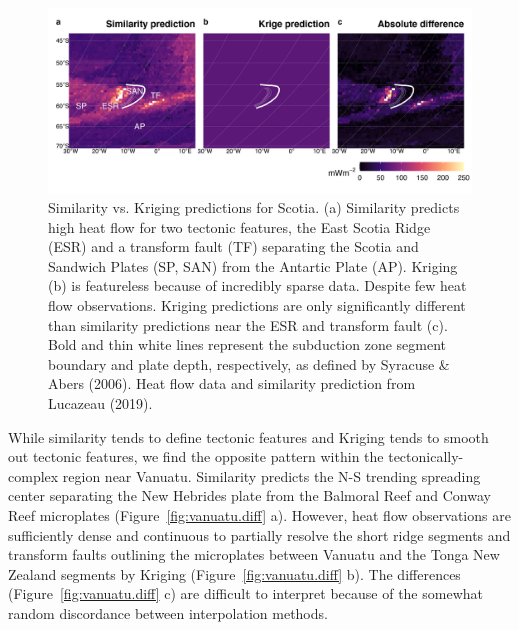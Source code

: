 \documentclass[draft,linenumbers]{agujournal2018}
\begin{document}
\begin{figure}[h]

{\centering \includegraphics[width=0.95\linewidth,]{../figs/diff/custom/Scotia} 

}

\caption{Similarity vs. Kriging predictions for Scotia. (a) Similarity predicts high heat flow for two tectonic features, the East Scotia Ridge (ESR) and a transform fault (TF) separating the Scotia and Sandwich Plates (SP, SAN) from the Antartic Plate (AP). Kriging (b) is featureless because of incredibly sparse data. Despite few heat flow observations. Kriging predictions are only significantly different than similarity predictions near the ESR and transform fault (c). Bold and thin white lines represent the subduction zone segment boundary and plate depth, respectively, as defined by Syracuse \& Abers (2006). Heat flow data and similarity prediction from Lucazeau (2019).}\label{fig:scotia.diff}
\end{figure}

While similarity tends to define tectonic features and Kriging tends to
smooth out tectonic features, we find the opposite pattern within the
tectonically-complex region near Vanuatu. Similarity predicts the N-S
trending spreading center separating the New Hebrides plate from the
Balmoral Reef and Conway Reef microplates (Figure~\ref{fig:vanuatu.diff}
a). However, heat flow observations are sufficiently dense and
continuous to partially resolve the short ridge segments and transform
faults outlining the microplates between Vanuatu and the Tonga New
Zealand segments by Kriging (Figure~\ref{fig:vanuatu.diff} b). The
differences (Figure~\ref{fig:vanuatu.diff} c) are difficult to interpret
because of the somewhat random discordance between interpolation
methods.
\end{document}
